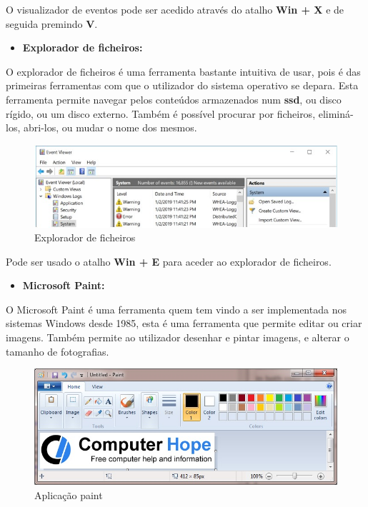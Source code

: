 \documentclass{report}
\begin{document}
O visualizador de eventos pode ser acedido através do atalho \textbf{Win + X} e de seguida premindo \textbf{V}.

\begin{itemize}
    \item \textbf{Explorador de ficheiros:}
\end{itemize}

O explorador de ficheiros é uma ferramenta bastante intuitiva de usar, pois é das primeiras ferramentas com que o utilizador do sistema operativo se depara. Esta ferramenta permite navegar pelos conteúdos armazenados num \textbf{\acs{ssd}}, ou disco rígido, ou um disco externo. Também é possível procurar por ficheiros, eliminá-los, abri-los, ou mudar o nome dos mesmos.

\begin{figure}[h!]
\includegraphics[width=1\textwidth]{event-viewer.jpg}
\centering
\caption{Explorador de ficheiros}
\end{figure}

Pode ser usado o atalho \textbf{Win + E} para aceder ao explorador de ficheiros. 
\begin{itemize}
    \item \textbf{Microsoft Paint:}
\end{itemize}

O Microsoft Paint é uma ferramenta quem tem vindo a ser implementada nos sistemas Windows desde 1985, esta é uma ferramenta que permite editar ou criar  imagens. Também permite ao utilizador desenhar e pintar imagens, e alterar o tamanho de fotografias.

\begin{figure}[h!]
\includegraphics[width=1\textwidth]{paint.jpg}
\centering
\caption{Aplicação paint}
\end{figure}
\end{document}
